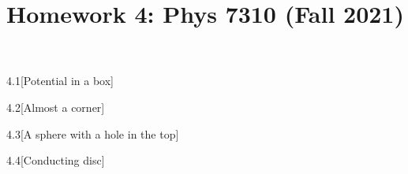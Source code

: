 \documentclass[12pt]{article}
\title{Homework 4: Phys 7310 (Fall 2021)}
\begin{document}
\maketitle
\begin{problem}{4.1}[Potential in a box]
\begin{solution}
\end{solution}
\end{problem}
\begin{problem}{4.2}[Almost a corner]
\begin{solution}
\end{solution}
\end{problem}
\begin{problem}{4.3}[A sphere with a hole in the top]
\begin{solution}
\end{solution}
\end{problem}
\begin{problem}{4.4}[Conducting disc]
\begin{solution}
\end{solution}
\end{problem}
\end{document}
